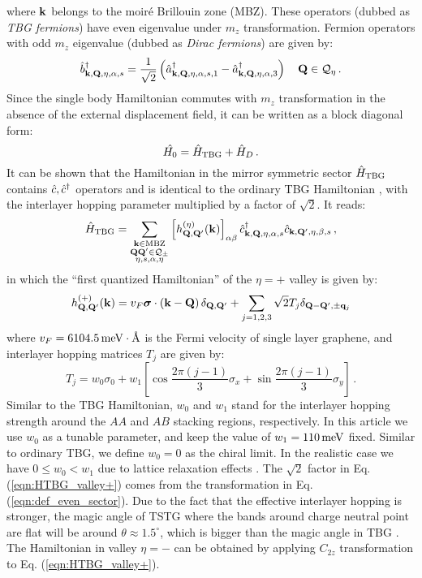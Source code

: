 \documentclass[prb,aps,nofootinbib,amssymb,twocolumn,superscriptaddress,10pt]{revtex4-2}
\begin{document}
where $\mathbf{k}$ belongs to the moir\'e Brillouin zone (MBZ). These operators (dubbed as \emph{TBG fermions}) have even eigenvalue under $m_z$ transformation. Fermion operators with odd $m_z$ eigenvalue (dubbed as \emph{Dirac fermions}) are given by:
\begin{equation}
	\hat{b}^\dagger_{\mathbf{k}, \mathbf{Q}, \eta, \alpha, s} = \frac{1}{\sqrt2} \left(\hat{a}^\dagger_{\mathbf{k}, \mathbf{Q}, \eta, \alpha, s, 1} - \hat{a}^\dagger_{\mathbf{k}, \mathbf{Q}, \eta, \alpha, 3}\right)~~~\mathbf{Q} \in \mathcal{Q}_{\eta}\,.
\end{equation}
Since the single body Hamiltonian commutes with $m_z$ transformation in the absence of the external displacement field, it can be written as a block diagonal form:
\begin{equation}
	\hat{H_0} = \hat{H}_{\rm TBG} + \hat{H}_D\,.
\end{equation}
It can be shown that the Hamiltonian in the mirror symmetric sector $\hat{H}_{\rm TBG}$ contains $\hat{c}, \hat{c}^\dagger$ operators and is identical to the ordinary TBG Hamiltonian \cite{BIS11,SON19}, with the interlayer hopping parameter multiplied by a factor of $\sqrt{2}$. It reads:
\begin{equation}
	\hat{H}_{\rm TBG} = \sum_{\substack{\mathbf{k}\in\mathrm{MBZ} \\ \mathbf{QQ}'\in\mathcal{Q}_{\pm} \\ {\eta,s,\alpha,\eta}}}\left[h_{\mathbf{Q},\mathbf{Q}'}^{(\eta)}(\mathbf{k})\right]_{\alpha\beta}\hat{c}^\dagger_{\mathbf{k}, \mathbf{Q}, \eta, \alpha, s} \hat{c}_{\mathbf{k},\mathbf{Q}',\eta, \beta, s}\,,
\end{equation}
in which the ``first quantized Hamiltonian'' of the $\eta=+$ valley is given by:
\begin{equation}\label{eqn:HTBG_valley+}
	h^{(+)}_{\mathbf{Q},\mathbf{Q}'}(\mathbf{k})=v_F\bm{\sigma}\cdot\left(\mathbf{k}-\mathbf{Q}\right)\delta_{\mathbf{Q},\mathbf{Q}'} + \sum_{j=1,2,3}\sqrt2 T_j \delta_{\mathbf{Q} - \mathbf{Q}', \pm \mathbf{q}_j}
\end{equation}
where $v_F = 6104.5\,\rm meV\cdot\textrm{\AA}$ is the Fermi velocity of single layer graphene, and interlayer hopping matrices $T_j$ are given by:
\begin{equation}
	T_j = w_0\sigma_0 + w_1\left[\cos\frac{2\pi(j-1)}{3}\sigma_x + \sin\frac{2\pi(j-1)}{3}\sigma_y\right]\,.
\end{equation}
Similar to the TBG Hamiltonian, $w_0$ and $w_1$ stand for the interlayer hopping strength around the $AA$ and $AB$ stacking regions, respectively. In this article we use $w_0$ as a tunable parameter, and keep the value of $w_1 = 110\,\rm meV$ fixed. Similar to ordinary TBG, we define $w_0=0$ as the chiral limit. In the realistic case we have $0 \leq w_0 < w_1$ due to lattice relaxation effects \cite{UCH14,WIJ15,JAI16,KOS18}. The $\sqrt2$ factor in Eq. (\ref{eqn:HTBG_valley+}) comes from the transformation in Eq. (\ref{eqn:def_even_sector}). Due to the fact that the effective interlayer hopping is stronger, the magic angle of TSTG where the bands around charge neutral point are flat will be around $\theta \approx 1.5^\circ$, which is bigger than the magic angle in TBG \cite{KHA19}. The Hamiltonian in valley $\eta = -$ can be obtained by applying $C_{2z}$ transformation to Eq. (\ref{eqn:HTBG_valley+}).
\end{document}
